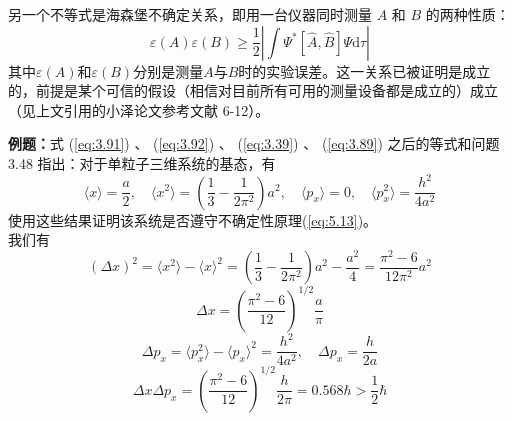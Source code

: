     另一个不等式是海森堡不确定关系，即用一台仪器同时测量 $A$ 和 $B$ 的两种性质：
    \begin{equation*}
        \varepsilon\left(A\right)\varepsilon\left(B\right) \ge \frac{1}{2}\left|\int \Psi^{\ast}\left[\hat{A},\hat{B}\right]\Psi\mathrm{d}\tau\right|
    \end{equation*}
    其中$\varepsilon\left(A\right)$和$\varepsilon\left(B\right)$分别是测量$A$与$B$时的实验误差。这一关系已被证明是成立的，前提是某个可信的假设（相信对目前所有可用的测量设备都是成立的）成立（见上文引用的小泽论文参考文献 6-12）。
    \begin{examplebox}
        \textbf{例题：}式 (\ref{eq:3.91}) 、 (\ref{eq:3.92}) 、 (\ref{eq:3.39}) 、 (\ref{eq:3.89}) 之后的等式和问题 3.48 指出：对于单粒子三维系统的基态，有
        \begin{equation*}
            \langle x \rangle = \frac{a}{2}, \quad \langle x^2 \rangle = \left(\frac{1}{3}-\frac{1}{2\pi^2}\right)a^2, \quad \langle p_x \rangle = 0, \quad \langle p_x^2 \rangle = \frac{h^2}{4a^2}
        \end{equation*}
        使用这些结果证明该系统是否遵守不确定性原理(\ref{eq:5.13})。
        \\ 
        
        我们有
        \begin{equation*}
            \left(\Delta x\right)^2 = \langle x^2 \rangle - \langle x \rangle^2 = \left(\frac{1}{3}-\frac{1}{2\pi^2}\right)a^2 - \frac{a^2}{4} = \frac{\pi^2-6}{12\pi^2}a^2
        \end{equation*}
        \begin{equation*}
            \Delta x = \left(\frac{\pi^2-6}{12}\right)^{1/2}\frac{a}{\pi}
        \end{equation*}
        \begin{equation*}
            \Delta p_x = \langle p_x^2 \rangle - \langle p_x \rangle^2 = \frac{h^2}{4a^2}, \quad \Delta p_x = \frac{h}{2a}
        \end{equation*}
        \begin{equation*}
            \Delta x \Delta p_x = \left(\frac{\pi^2-6}{12}\right)^{1/2}\frac{h}{2\pi} = 0.568\hbar > \frac{1}{2}\hbar
        \end{equation*}
    \end{examplebox}

